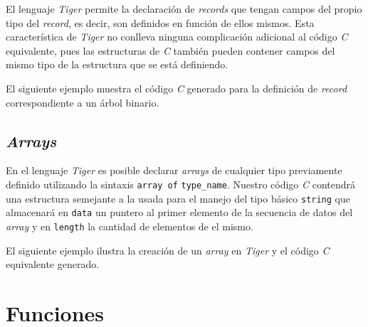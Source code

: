 \documentclass{article}
\begin{document}
\begin{quote}

\end{quote}

\begin{quote}

\end{quote}

El lenguaje \textit{Tiger} permite la declaración de \textit{records}
que tengan campos del propio tipo del \emph{record}, es decir, son definidos en
función de ellos mismos. Esta característica de \textit{Tiger} no conlleva
ninguna complicación adicional al código \textit{C} equivalente, pues las
estructuras de \textit{C} también pueden contener campos del mismo tipo de la
estructura que se está definiendo.

El siguiente ejemplo muestra el código \textit{C} generado para la definición
de \textit{record} correspondiente a un árbol binario.

\begin{quote}

\end{quote}

\begin{quote}

\end{quote}

\subsection{\emph{Arrays}}

En el lenguaje \textit{Tiger} es posible declarar \textit{arrays} de cualquier
tipo previamente definido utilizando la sintaxis \texttt{array of}
\texttt{type\_name}. Nuestro código \textit{C} contendrá una estructura
semejante a la usada para el manejo del tipo básico \texttt{string} que
almacenará en \texttt{data} un puntero al primer elemento de la secuencia de
datos del \emph{array} y en \texttt{length} la cantidad de elementos de el
mismo.

El siguiente ejemplo ilustra la creación de un \textit{array} en \textit{Tiger}
y el código \textit{C} equivalente generado.

\begin{quote}

\end{quote}

\begin{quote}

\end{quote}

\section{Funciones}
\end{document}
